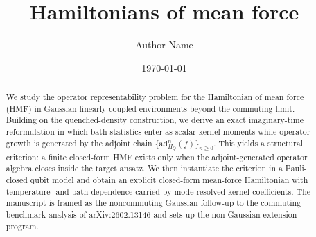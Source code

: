 ﻿\documentclass[aps,prl,twocolumn,superscriptaddress,showpacs]{revtex4-2}
\begin{document}
\title{Hamiltonians of mean force}
\author{Author Name}
\date{\today}

\begin{abstract}
We study the operator representability problem for the Hamiltonian of mean force
(HMF) in Gaussian linearly coupled environments beyond the commuting limit.
Building on the quenched-density construction, we derive an exact
imaginary-time reformulation in which bath statistics enter as scalar kernel
moments while operator growth is generated by the adjoint chain
$\{\mathrm{ad}_{H_Q}^{n}(f)\}_{n\ge 0}$. This yields a structural criterion:
a finite closed-form HMF exists only when the adjoint-generated operator
algebra closes inside the target ansatz. We then instantiate the criterion in a
Pauli-closed qubit model and obtain an explicit closed-form mean-force
Hamiltonian with temperature- and bath-dependence carried by mode-resolved
kernel coefficients. The manuscript is framed as the noncommuting Gaussian
follow-up to the commuting benchmark analysis of arXiv:2602.13146 and sets up
the non-Gaussian extension program.
\end{abstract}

\maketitle





% 
% 



% 


\appendix
\setcounter{secnumdepth}{2}


% 




\end{document}
